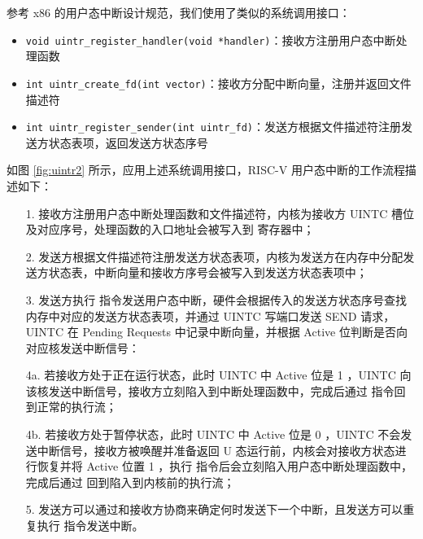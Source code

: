 参考 x86 的用户态中断设计规范\cite{x86uintr}，我们使用了类似的系统调用接口：

\begin{itemize}
    \item \texttt{void uintr_register_handler(void *handler)}：接收方注册用户态中断处理函数
    \item \texttt{int uintr_create_fd(int vector)}：接收方分配中断向量，注册并返回文件描述符
    \item \texttt{int uintr_register_sender(int uintr_fd)}：发送方根据文件描述符注册发送方状态表项，返回发送方状态序号
\end{itemize}

如图 \ref{fig:uintr2} 所示，应用上述系统调用接口，RISC-V 用户态中断的工作流程描述如下：

\begin{itemize}
    \item[1.] 接收方注册用户态中断处理函数和文件描述符，内核为接收方 UINTC 槽位及对应序号，处理函数的入口地址会被写入到 \Rutvec 寄存器中；
    \item[2.] 发送方根据文件描述符注册发送方状态表项，内核为发送方在内存中分配发送方状态表，中断向量和接收方序号会被写入到发送方状态表项中；
    \item[3.] 发送方执行 \Iuipisend 指令发送用户态中断，硬件会根据传入的发送方状态序号查找内存中对应的发送方状态表项，并通过 UINTC 写端口发送 SEND 请求，UINTC 在 Pending Requests 中记录中断向量，并根据 Active 位判断是否向对应核发送中断信号：
    \item[4a.] 若接收方处于正在运行状态，此时 UINTC 中 Active 位是 1 ，UINTC 向该核发送中断信号，接收方立刻陷入到中断处理函数中，完成后通过 \Iuret 指令回到正常的执行流；
    \item[4b.] 若接收方处于暂停状态，此时 UINTC 中 Active 位是 0 ，UINTC 不会发送中断信号，接收方被唤醒并准备返回 U 态运行前，内核会对接收方状态进行恢复并将 Active 位置 1 ，执行 \Isret 指令后会立刻陷入用户态中断处理函数中，完成后通过 \Iuret 回到陷入到内核前的执行流；
    \item[5.] 发送方可以通过和接收方协商来确定何时发送下一个中断，且发送方可以重复执行 \Iuipisend 指令发送中断。 
\end{itemize}
